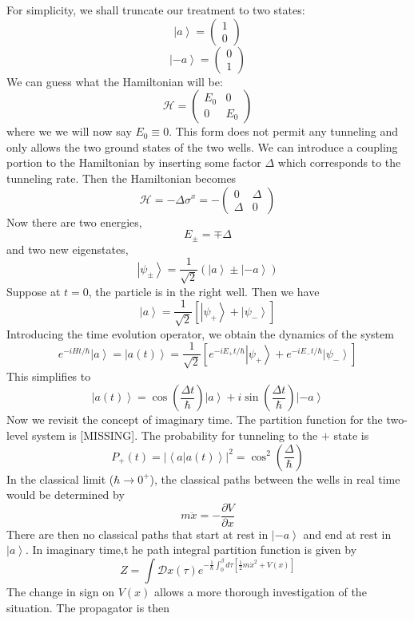 \documentclass{article}
\begin{document}
	\noindent For simplicity, we shall truncate our treatment to two states:
	$$\left|a\right>=\begin{pmatrix}1\\0\end{pmatrix}$$
	$$\left|-a\right>=\begin{pmatrix}0\\1\end{pmatrix}$$
	We can guess what the Hamiltonian will be:
	$$\mathcal{H}=\begin{pmatrix}E_0&0\\0&E_0\end{pmatrix}$$
	where we we will now say $E_0\equiv 0$.  This form does not permit any tunneling and only allows the two ground states of the two wells. We can introduce a coupling portion to the Hamiltonian by inserting some factor $\Delta$ which corresponds to the tunneling rate. Then the Hamiltonian becomes
	$$\mathcal{H}=-\Delta\sigma^x=-\begin{pmatrix}0&\Delta\\\Delta&0\end{pmatrix}$$
	Now there are two energies,
	$$E_{\pm}=\mp\Delta$$
	and two new eigenstates,
	$$\left|\psi_{\pm}\right>=\frac{1}{\sqrt{2}}\left(\left|a\right>\pm\left|-a\right>\right)$$
	Suppose at $t=0$, the particle is in the right well. Then we have
	$$\left|a\right>=\frac{1}{\sqrt{2}}\left[\left|\psi_+\right>+\left|\psi_-\right>\right]$$
	Introducing the time evolution operator, we obtain the dynamics of the system
	$$e^{-iHt/\hbar}\left|a\right>=\left|a(t)\right>=\frac{1}{\sqrt{2}}\left[e^{-iE_+t/\hbar}\left|\psi_+\right>+e^{-iE_-t/\hbar}\left|\psi_-\right>\right]$$
	This simplifies to
	$$\left|a(t)\right>=\cos\left(\frac{\Delta t}{\hbar}\right)\left|a\right>+i\sin\left(\frac{\Delta t}{\hbar}\right)\left|-a\right>$$
	Now we revisit the concept of imaginary time. The partition function for the two-level system is [MISSING]. The probability for tunneling to the $+$ state is
	$$P_+(t)=\left|\left<a|a(t)\right>\right|^2=\cos^2\left(\frac{\Delta}{\hbar}\right)$$
	In the classical limit ($\hbar\to0^+$), the classical paths between the wells in real time would be determined by
	$$m\ddot{x}=-\frac{\partial V}{\partial x}$$
	There are then no classical paths that start at rest in $\left|-a\right>$ and end at rest in $\left|a\right>$. In imaginary time,t he path integral partition function is given by
	$$Z=\int\mathcal{D}x(\tau)e^{-\frac{1}{\hbar}\int_0^\beta d\tau\left[\frac{1}{2}m\dot{x}^2+V(x)\right]}$$
	The change in sign on $V(x)$ allows a more thorough investigation of the situation. The propagator is then
\end{document}
